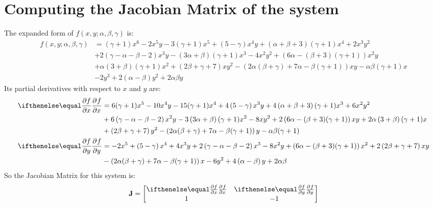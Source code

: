 \section{Computing the Jacobian Matrix of the system}\label{sec:computing-the-jacobian-matrix-of-the-system}
The expanded form of $f(x,y;\alpha,\beta,\gamma)$ is:
\begin{align*}
    f(x,y;\alpha,\beta,\gamma) &= (\gamma+1)x^6 - 2x^5y - 3(\gamma+1)x^5 + \left(5-\gamma\right)x^4y + \left(\alpha+\beta+3\right)(\gamma+1)x^4 + 2x^3y^2\\
    &+ 2\left(\gamma-\alpha-\beta-2\right)x^3y - \left(3\alpha+\beta\right)(\gamma+1)x^3 - 4x^2y^2 + \left(6\alpha-(\beta+3)(\gamma+1)\right)x^2y\\
    &+ \alpha\left(3+\beta\right)(\gamma+1)x^2 + \left(2\beta+\gamma+7\right)xy^2 - \left(2\alpha(\beta+\gamma)+7\alpha-\beta(\gamma+1)\right)xy - \alpha\beta(\gamma+1)x\\
    &- 2y^3 + 2\left(\alpha-\beta\right)y^2 + 2\alpha\beta y
\end{align*}
Its partial derivatives with respect to $x$ and $y$ are:
\begin{align*}
    \pdiff[]{f}{x} &= 6(\gamma+1)x^5 - 10x^4y - 15(\gamma+1)x^4 + 4\left(5-\gamma\right)x^3y + 4\left(\alpha+\beta+3\right)(\gamma+1)x^3 + 6x^2y^2\\
    &+ 6\left(\gamma-\alpha-\beta-2\right)x^2y - 3\left(3\alpha+\beta\right)(\gamma+1)x^2 - 8xy^2 + 2\left(6\alpha-(\beta+3)(\gamma+1)\right)xy + 2\alpha\left(3+\beta\right)(\gamma+1)x\\
    &+ \left(2\beta+\gamma+7\right)y^2 - \left(2\alpha(\beta+\gamma)+7\alpha-\beta(\gamma+1)\right)y - \alpha\beta(\gamma+1)\\
    \pdiff[]{f}{y} &= - 2x^5 + \left(5-\gamma\right)x^4 + 4x^3y + 2\left(\gamma-\alpha-\beta-2\right)x^3 - 8x^2y + \left(6\alpha-(\beta+3)(\gamma+1)\right)x^2 + 2\left(2\beta+\gamma+7\right)xy\\
    &- \left(2\alpha(\beta+\gamma)+7\alpha-\beta(\gamma+1)\right)x - 6y^2 + 4\left(\alpha-\beta\right)y + 2\alpha\beta
\end{align*}
So the Jacobian Matrix for this system is:
\begin{equation}
    \textbf{J} = \begin{bmatrix}
        \pdiff[]{f}{x} & \pdiff[]{f}{y}\\
        1 & -1
    \end{bmatrix}
    \label{eq:2}
\end{equation}
